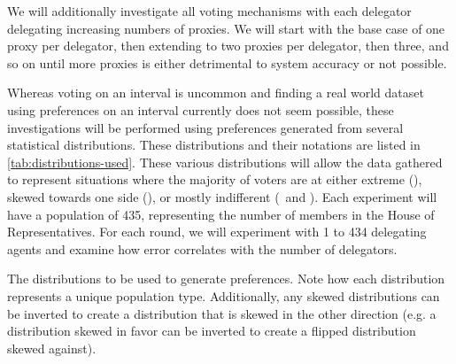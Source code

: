 We will additionally investigate all voting mechanisms with each delegator delegating
increasing numbers of proxies.
We will start with the base case of one proxy per delegator, then extending to two
proxies per delegator, then three, and so on until more proxies is either detrimental
to system accuracy or not possible.

Whereas voting on an interval is uncommon and finding a real world dataset using
preferences on an interval currently does not seem possible, these investigations
will be performed using preferences generated from several statistical distributions.
These distributions and their notations are listed in \autoref{tab:distributions-used}.
These various distributions will allow the data gathered to represent situations
where the majority of voters are at either extreme (),
skewed towards one side (), or mostly indifferent
(\gaussiandist\ and ).
Each experiment will have a population of 435, representing the number of members in
the House of Representatives.
For each round, we will experiment with 1 to 434 delegating agents and examine how
error correlates with the number of delegators.

\begin{table}[!htbp]
    \renewcommand{\arraystretch}{1.3}

    \caption{
        The distributions to be used to generate preferences.
        Note how each distribution represents a unique population type.
        Additionally, any skewed distributions can be inverted to create a
        distribution that is skewed in the other direction (e.g. a distribution
        skewed in favor can be inverted to create a flipped distribution skewed
        against).
    }
    \label{tab:distributions-used}

    \centering
    
\end{table}

